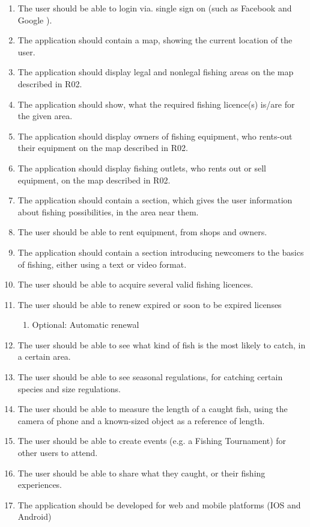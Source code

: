 \begin{enumerate}[R1]
	\item The user should be able to login via. single sign on (such as Facebook and Google \cite{oauth}).
	\item The application should contain a map, showing the current location of the user.
	\item The application should display legal and nonlegal fishing areas on the map described in R02.
	\item The application should show, what the required fishing licence(s) is/are for the given area.
	\item The application should display owners of fishing equipment, who rents-out their	equipment on the map described in R02.
	\item The application should display fishing outlets, who rents out or sell equipment, on	the map described in R02.
	\item The application should contain a section, which gives the user information about fishing possibilities, in the area near them.
	\item The user should be able to rent equipment, from shops and owners.
	\item The application should contain a section introducing newcomers to the basics of fishing, either using a text or video format.
	\item The user should be able to acquire several valid fishing licences.
	\item The user should be able to renew expired or soon to be expired licenses \begin{enumerate}[R11.1]
	\item Optional: Automatic renewal \end{enumerate}
	\item The user should be able to see what kind of fish is the most likely to catch, in a certain area.
	\item The user should be able to see seasonal regulations, for catching certain species and size regulations.
	\item The user should be able to measure the length of a caught fish, using the camera of phone and a known-sized object as a reference of length.
	\item The user should be able to create events (e.g. a Fishing Tournament) for other users to attend.
	\item The user should be able to share what they caught, or their fishing experiences.
	\item The application should be developed for web and mobile platforms (IOS and Android)
\end{enumerate}
